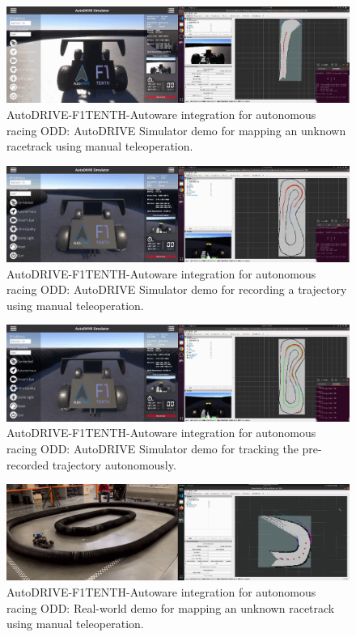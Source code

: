 \begin{figure}[H]
    \centering
    \includegraphics[width=\linewidth]{Figures/fig13.png}
    \caption{AutoDRIVE-F1TENTH-Autoware integration for autonomous racing ODD: AutoDRIVE Simulator demo for mapping an unknown racetrack using manual teleoperation.}
    \label{fig: figure13}
\end{figure}

\begin{figure}[H]
    \centering
    \includegraphics[width=\linewidth]{Figures/fig14.png}
    \caption{AutoDRIVE-F1TENTH-Autoware integration for autonomous racing ODD: AutoDRIVE Simulator demo for recording a trajectory using manual teleoperation.}
    \label{fig: figure14}
\end{figure}

\begin{figure}[H]
    \centering
    \includegraphics[width=\linewidth]{Figures/fig15.png}
    \caption{AutoDRIVE-F1TENTH-Autoware integration for autonomous racing ODD: AutoDRIVE Simulator demo for tracking the pre-recorded trajectory autonomously.}
    \label{fig: figure15}
\end{figure}

\begin{figure}[H]
    \centering
    \includegraphics[width=\linewidth]{Figures/fig16.png}
    \caption{AutoDRIVE-F1TENTH-Autoware integration for autonomous racing ODD: Real-world demo for mapping an unknown racetrack using manual teleoperation.}
    \label{fig: figure16}
\end{figure}

